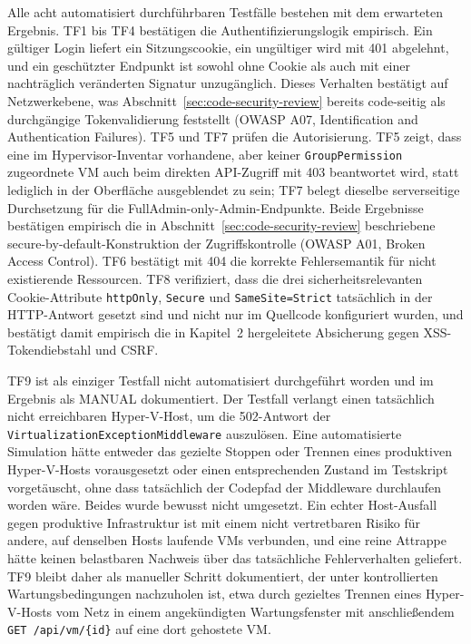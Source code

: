 \documentclass[12pt,a4paper]{article}
\begin{document}
Alle acht automatisiert durchführbaren Testfälle bestehen mit dem erwarteten Ergebnis. TF1 bis TF4 bestätigen die Authentifizierungslogik empirisch. Ein gültiger Login liefert ein Sitzungscookie, ein ungültiger wird mit 401 abgelehnt, und ein geschützter Endpunkt ist sowohl ohne Cookie als auch mit einer nachträglich veränderten Signatur unzugänglich. Dieses Verhalten bestätigt auf Netzwerkebene, was Abschnitt~\ref{sec:code-security-review} bereits code-seitig als durchgängige Tokenvalidierung feststellt (OWASP A07, Identification and Authentication Failures). TF5 und TF7 prüfen die Autorisierung. TF5 zeigt, dass eine im Hypervisor-Inventar vorhandene, aber keiner \texttt{GroupPermission} zugeordnete VM auch beim direkten API-Zugriff mit 403 beantwortet wird, statt lediglich in der Oberfläche ausgeblendet zu sein; TF7 belegt dieselbe serverseitige Durchsetzung für die FullAdmin-only-Admin-Endpunkte. Beide Ergebnisse bestätigen empirisch die in Abschnitt~\ref{sec:code-security-review} beschriebene secure-by-default-Konstruktion der Zugriffskontrolle (OWASP A01, Broken Access Control). TF6 bestätigt mit 404 die korrekte Fehlersemantik für nicht existierende Ressourcen. TF8 verifiziert, dass die drei sicherheitsrelevanten Cookie-Attribute \texttt{httpOnly}, \texttt{Secure} und \texttt{SameSite=Strict} tatsächlich in der HTTP-Antwort gesetzt sind und nicht nur im Quellcode konfiguriert wurden, und bestätigt damit empirisch die in Kapitel~2 hergeleitete Absicherung gegen XSS-Tokendiebstahl und CSRF.

TF9 ist als einziger Testfall nicht automatisiert durchgeführt worden und im Ergebnis als MANUAL dokumentiert. Der Testfall verlangt einen tatsächlich nicht erreichbaren Hyper-V-Host, um die 502-Antwort der \texttt{VirtualizationExceptionMiddleware} auszulösen. Eine automatisierte Simulation hätte entweder das gezielte Stoppen oder Trennen eines produktiven Hyper-V-Hosts vorausgesetzt oder einen entsprechenden Zustand im Testskript vorgetäuscht, ohne dass tatsächlich der Codepfad der Middleware durchlaufen worden wäre. Beides wurde bewusst nicht umgesetzt. Ein echter Host-Ausfall gegen produktive Infrastruktur ist mit einem nicht vertretbaren Risiko für andere, auf denselben Hosts laufende VMs verbunden, und eine reine Attrappe hätte keinen belastbaren Nachweis über das tatsächliche Fehlerverhalten geliefert. TF9 bleibt daher als manueller Schritt dokumentiert, der unter kontrollierten Wartungsbedingungen nachzuholen ist, etwa durch gezieltes Trennen eines Hyper-V-Hosts vom Netz in einem angekündigten Wartungsfenster mit anschließendem \texttt{GET /api/vm/\{id\}} auf eine dort gehostete VM.
\end{document}
